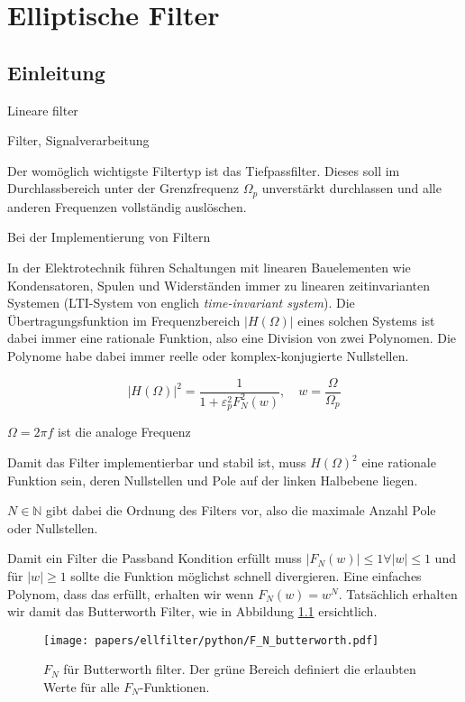 %
%
%
\chapter{Elliptische Filter\label{chapter:ellfilter}}
\begin{refsection}


\section{Einleitung}

Lineare filter

Filter, Signalverarbeitung


Der womöglich wichtigste Filtertyp ist das Tiefpassfilter.
Dieses soll im Durchlassbereich unter der Grenzfrequenz $\Omega_p$ unverstärkt durchlassen und alle anderen Frequenzen vollständig auslöschen.

Bei der Implementierung von Filtern


In der Elektrotechnik führen Schaltungen mit linearen Bauelementen wie Kondensatoren, Spulen und Widerständen immer zu linearen zeitinvarianten Systemen (LTI-System von englich \textit{time-invariant system}).
Die Übertragungsfunktion im Frequenzbereich $|H(\Omega)|$ eines solchen Systems ist dabei immer eine rationale Funktion, also eine Division von zwei Polynomen.
Die Polynome habe dabei immer reelle oder komplex-konjugierte Nullstellen.


\begin{equation} \label{ellfilter:eq:h_omega}
    | H(\Omega)|^2 = \frac{1}{1 + \varepsilon_p^2 F_N^2(w)}, \quad w=\frac{\Omega}{\Omega_p}
\end{equation}

$\Omega = 2 \pi f$ ist die analoge Frequenz


Damit das Filter implementierbar und stabil ist, muss $H(\Omega)^2$ eine rationale Funktion sein, deren Nullstellen und Pole auf der linken Halbebene liegen.

$N \in \mathbb{N} $ gibt dabei die Ordnung des Filters vor, also die maximale Anzahl Pole oder Nullstellen.



Damit ein Filter die Passband Kondition erfüllt muss $|F_N(w)| \leq 1 \forall |w| \leq 1$ und für $|w| \geq 1$ sollte die Funktion möglichst schnell divergieren.
Eine einfaches Polynom, dass das erfüllt, erhalten wir wenn $F_N(w) = w^N$.
Tatsächlich erhalten wir damit das Butterworth Filter, wie in Abbildung \ref{ellfilter:fig:butterworth} ersichtlich.
\begin{figure}
    \centering
    \texttt{[image: papers/ellfilter/python/F\_N\_butterworth.pdf]}
    \caption{$F_N$ für Butterworth filter. Der grüne Bereich definiert die erlaubten Werte für alle $F_N$-Funktionen.}
    \label{ellfilter:fig:butterworth}
\end{figure}


\end{refsection}

